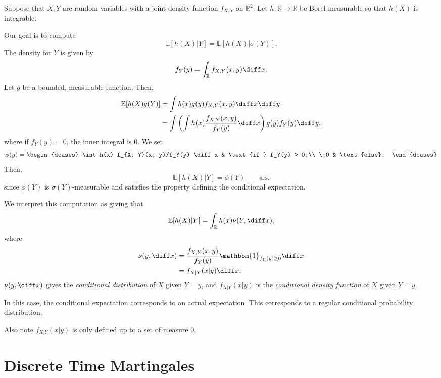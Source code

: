 \documentclass[12pt]{article}
\begin{document}
\begin{exbox}
	Suppose that $X, Y$ are random variables with a joint density function $f_{X, Y}$ on $\mathbb{R}^2$. Let $h : \mathbb{R} \to \mathbb{R}$ be Borel measurable so that $h(X)$ is integrable.

	Our goal is to compute
	\[
	\mathbb{E}[h(X) | Y] = \mathbb{E}[h(X) | \sigma(Y)].
	\]
	The density for $Y$ is given by
	\[
	f_Y(y) = \int_{\mathbb{R}} f_{X, Y} (x, y) \diff x.
	\]
	Let $g$ be a bounded, measurable function. Then,
	\begin{align*}
		\mathbb{E}[h(X) g(Y)] &= \int h(x) g(y) f_{X, Y}(x, y) \diff x \diff y \\
				      &= \int \left( \int h(x) \frac{f_{X, Y}(x, y)}{f_{Y}(y)} \diff x \right) g(y) f_{Y}(y) \diff y,
	\end{align*}
	where if $f_Y(y) = 0$, the inner integral is 0. We set
	\[
	\phi(y) =
	\begin{dcases}
		\int h(x) f_{X, Y}(x, y)/f_Y(y) \diff x & \text{if } f_Y(y) > 0,\\
		\;0 & \text{else}.
	\end{dcases}
	\]
	Then,
	\[
		\mathbb{E}[h(X)|Y] = \phi(Y) \qquad \text{a.s.}
	\]
	since $\phi(Y)$ is $\sigma(Y)$-measurable and satisfies the property defining the conditional expectation.

	We interpret this computation as giving that
	\[
	\mathbb{E}[h(X)|Y] = \int_{\mathbb{R}}h(x) \nu(Y, \diff x),
	\]
	where
	\begin{align*}
		\nu(y, \diff x) &= \frac{f_{X, Y}(x, y)}{f_Y(y)} \mathbbm{1}_{f_Y(y) \geq 0} \diff x \\
				&= f_{X|Y}(x|y) \diff x.
	\end{align*}
	$\nu(y, \diff x)$ gives the \emph{conditional distribution} of $X$ given $Y = y$, and $f_{X|Y}(x|y)$ is the \emph{conditional density function} of $X$ given $Y = y$.
\end{exbox}

In this case, the conditional expectation corresponds to an actual expectation. This corresponds to a regular conditional probability distribution.

Also note $f_{X|Y}(x|y)$ is only defined up to a set of measure $0$.


\newpage

\section{Discrete Time Martingales}%
\label{sec:dtm}
\end{document}
